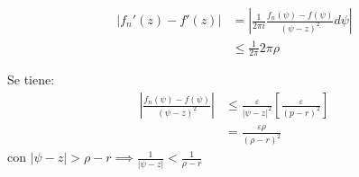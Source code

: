 \begin{teorema}
\begin{dem}
\begin{enumerate}
            \begin{align*}
                |f_n'(z)-f'(z)| &=\left|\frac{1}{2\pi i}\frac{f_n(\psi)-f(\psi)}{(\psi - z)^2}d\psi\right|\\
                &\leq \frac{1}{2\pi}2\pi \rho
            \end{align*}
            \begin{cajita}
                Se tiene: 
                \begin{align*}
                    \left|\frac{f_n(\psi)-f(\psi)}{(\psi - z)^2}\right| &\leq \frac{\varepsilon}{|\psi -z|^2}\left[\frac{\varepsilon}{(p-r)^2}\right]\\
                    &= \frac{\varepsilon \rho}{(\rho-r)^2}
                \end{align*}
                con $|\psi -z|>\rho -r\implies \frac{1}{|\psi - z|}<\frac{1}{\rho-r}$
            \end{cajita}
        \end{enumerate}
    \end{dem}
\end{teorema}

